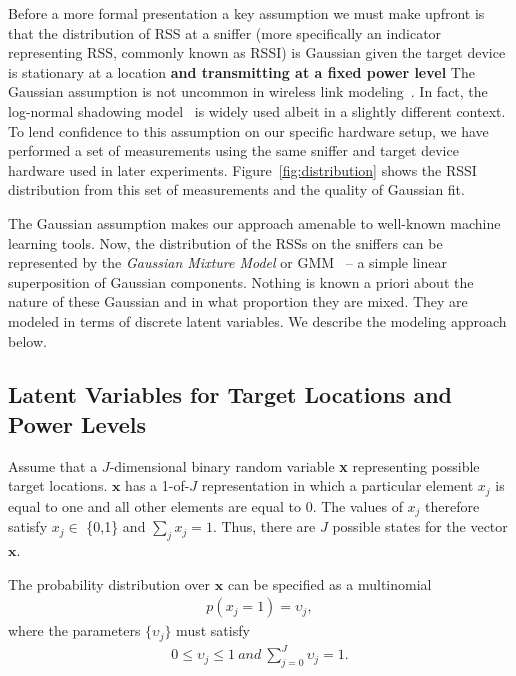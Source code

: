 Before a more formal presentation a key assumption we must make upfront
is that the distribution of RSS at a sniffer (more specifically an indicator representing RSS, commonly known as RSSI) is Gaussian
given the target device is stationary at a location {\bf and transmitting at
a fixed power level} The Gaussian assumption is not uncommon in wireless link modeling~\cite{Haeberlen:2004:PRL:1023720.1023728, Moraes:2006:CWL:1164783.1164799, Tao:2003:WLL:941311.941314}. In fact, the log-normal shadowing model~\cite{} is widely used albeit in a slightly different context. To lend confidence to this assumption on our specific hardware setup, we have performed a set of measurements using the same sniffer and target device hardware used in later experiments. 
Figure~\ref{fig:distribution} shows the RSSI distribution from this set of measurements and the quality of Gaussian fit. 

The Gaussian assumption makes our approach amenable to well-known machine learning tools. Now,
the distribution of the RSSs on the sniffers can be represented by the \emph{Gaussian Mixture Model} or GMM~\cite{Reynolds, Bishop:2006:PRM:1162264} --  a simple linear superposition of Gaussian components. 
Nothing is known a priori about the nature of these Gaussian
and in what proportion they are mixed. They are modeled in terms of discrete latent variables. We describe the modeling approach below.  

\subsection{Latent Variables for Target Locations and Power Levels}
\label{subsec:latentvariablesfortargetlocationsandpowerlevels}

Assume that a $J$-dimensional binary random variable {\bf x} representing possible target locations. $\mathbf{x}$ has a 1-of-$J$ representation in which a particular element $x_{j}$ is equal to one and all other elements are equal to $0$. The values of $x_{j}$ therefore satisfy $x_{j} \in$ \{0,1\} and $\sum_{j} x_{j} = 1$. Thus, there are $J$ possible states for the vector $\mathbf{x}$.

The probability distribution over $\mathbf{x}$ can be specified as a multinomial 
\begin{align}
 p(x_{j} = 1) = \upsilon_{j},
\end{align}
where the parameters $\{\upsilon_{j}\}$ must satisfy
\begin{align}
0 \le \upsilon_{j} \le 1 \ and \ \sum_{j=0}^{J} \upsilon_{j} = 1.
\end{align}

